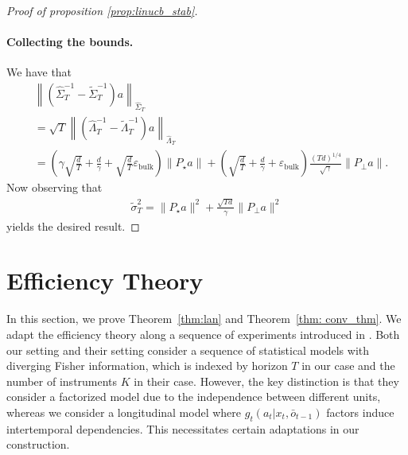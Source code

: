 \documentclass[11pt]{article}
\begin{document}
\begin{proof}[Proof of proposition \ref{prop:linucb_stab}]
\paragraph{Collecting the bounds.} We have that
\begin{align*}
&\left\lVert ( \widehat\Sigma_T^{-1} - \widetilde\Sigma_T^{-1}) a   \right\rVert_{\widehat\Sigma_T}\\
&= \sqrt{T} \left\lVert (\widehat \Lambda_T^{-1} - \widetilde\Lambda_T^{-1}) a \right\rVert_{\widehat \Lambda_T}
\\
&= \left( \gamma \sqrt{\frac{d}{T}} + \frac{d}{\gamma} + \sqrt{\frac{d}{T}} \varepsilon_{\mathrm{bulk}} \right) \| P_\star a\| + 
\left( \sqrt{\frac{d}{T}} + \frac{d}{\gamma} + \varepsilon_{\mathrm{bulk}} \right) \frac{(T d)^{1/4}}{\sqrt{\gamma}}\|P_\perp a\|.
\end{align*}
Now observing that 
\begin{align*}
    \widetilde\sigma_T^2 = \|P_\star a\|^2 + \frac{\sqrt{Td}}{
    \gamma} \| P_\perp a\|^2
\end{align*}
yields the desired result. 
\end{proof}


\section{Efficiency Theory}
\label{app:efficiency}
In this section, we prove Theorem~\ref{thm:lan} and Theorem~\ref{thm: conv_thm}. We adapt the efficiency theory along a sequence of experiments introduced in \citet[Section I]{vanderlaan2026nonparametricinstrumentalvariableinference}. Both our setting and their setting consider a sequence of statistical models with diverging Fisher information, which is indexed by horizon $T$ in our case and the number of instruments $K$ in their case. However, the key distinction is that they consider a factorized model \citet{bickel1993efficient} due to the independence between different units, whereas we consider a longitudinal model where $g_t(a_t|x_t, \bar{o}_{t-1})$ factors induce intertemporal dependencies. This necessitates certain adaptations in our construction. 
\end{document}
